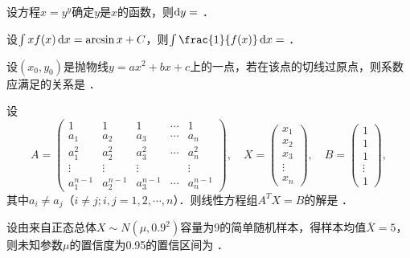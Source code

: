 \documentclass[plain,noanswer,medmath]{../../template/jnuexam}
\begin{document}




\begin{problem}
设方程$x = y^y$确定$y$是$x$的函数，则$\mathop{}\!\mathrm{d} y =$ \fillin{}．
\end{problem}


\begin{problem}
设$\int x f(x)\mathop{}\!\mathrm{d} x = \arcsin x + C$，则$\int \frac{1}{f(x)} \dx =$ \fillin{}．
\end{problem}


\begin{problem}
设$\left(x_0,y_0 \right)$是抛物线$y = ax^2 + bx + c$上的一点，若在该点的切线过原点，则系数应满足的关系是 \fillin{}．
\end{problem}


\begin{problem}
设
$$A = \begin{pmatrix}
            1 &           1 &           1 & \cdots & 1 \\
          a_1 &         a_2 &         a_3 & \cdots & a_n \\
        a_1^2 &       a_2^2 &       a_3^2 & \cdots & a_n^2 \\
       \vdots &      \vdots &      \vdots &        & \vdots \\
  a_1^{n - 1} & a_2^{n - 1} & a_3^{n - 1} & \cdots & a_n^{n - 1}
\end{pmatrix},\quad X = \begin{pmatrix}
  x_1 \\
  x_2 \\
  x_3 \\
  \vdots \\
  x_n
\end{pmatrix},\quad B = \begin{pmatrix}
  1 \\
  1 \\
  1 \\
  \vdots \\
  1
\end{pmatrix},$$
其中$a_i \ne a_j$（$i \ne j;i,j = 1,2, \cdots ,n$）．则线性方程组$A^T X = B$的解是 \fillin{}．
\end{problem}


\begin{problem}
设由来自正态总体$X\sim N(\mu ,0.9^2)$容量为9的简单随机样本，得样本均值$\overline{X}= 5$，
则未知参数$\mu$的置信度为0.95的置信区间为 \fillin{}．
\end{problem}
\end{document}

